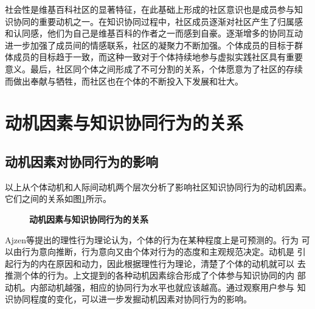 社会性是维基百科社区的显著特征，在此基础上形成的社区意识也是成员参与知
识协同的重要动机之一。在知识协同过程中，社区成员逐渐对社区产生了归属感
和认同感，他们为自己是维基百科的作者之一而感到自豪。逐渐增多的协同互动
进一步加强了成员间的情感联系，社区的凝聚力不断加强。个体成员的目标于群
体成员的目标趋于一致，而这种一致对于个体持续地参与虚拟实践社区具有重要
意义。最后，社区同个体之间形成了不可分割的关系，个体愿意为了社区的存续
而做出奉献与牺牲，而社区也在个体的不断投入下发展和壮大。


\section{动机因素与知识协同行为的关系}
  
\subsection{动机因素对协同行为的影响}

以上从个体动机和人际间动机两个层次分析了影响社区知识协同行为的动机因素。
它们之间的关系如图\ref{fig:motivation}所示。
\begin{figure}[!htb]
 
    \centering
    \caption{\small{\textbf{动机因素与知识协同行为的关系}}}
  \label{fig:motivation}
  \end{figure}

Ajzen等提出的理性行为理论认为，个体的行为在某种程度上是可预测的。行为
可以由行为意向推断，行为意向又由个体对行为的态度和主观规范决定。动机是
引起行为的内在原因和动力，因此根据理性行为理论，清楚了个体的动机就可以
去推测个体的行为。上文提到的各种动机因素综合形成了个体参与知识协同的内
部动机。内部动机越强，相应的协同行为水平也就应该越高。通过观察用户参与
知识协同程度的变化，可以进一步发掘动机因素对协同行为的影响。

